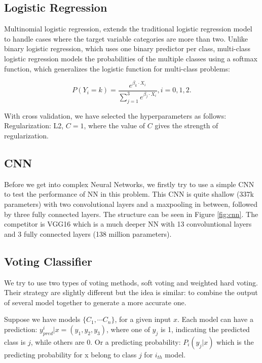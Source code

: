 \documentclass[
  11pt,
]{article}
\begin{document}
\hypertarget{logistic-regression}{%
\subsection{Logistic Regression}\label{logistic-regression}}

Multinomial logistic regression, extends the traditional logistic regression model to handle cases where the target variable categories are more than two. Unlike binary logistic regression, which uses one binary predictor per class, multi-class logistic regression models the probabilities of the multiple classes using a softmax function, which generalizes the logistic function for multi-class problems:

\[
P(Y_i = k) = \frac{e^{\beta_k \cdot X_i}}{\sum_{j = 1}^3 e^{\beta_j \cdot X_i}}, i = 0, 1, 2.
\]

With cross validation, we have selected the hyperparameters as follows: Regularization: L2, \(C = 1\), where the value of \(C\) gives the strength of regularization.

\hypertarget{cnn}{%
\subsection{CNN}\label{cnn}}

Before we get into complex Neural Networks, we firstly try to use a simple CNN to test the performance of NN in this problem. This CNN is quite shallow (337k parameters) with two convolutional layers and a maxpooling in between, followed by three fully connected layers. The structure can be seen in Figure \ref{fig:cnn}. The competitor is VGG16 which is a much deeper NN with 13 convoluntional layers and 3 fully connected layers (138 million parameters).

\hypertarget{voting-classifier}{%
\subsection{Voting Classifier}\label{voting-classifier}}

We try to use two types of voting methods, soft voting and weighted hard voting. Their strategy are slightly different but the idea is similar: to combine the output of several model together to generate a more accurate one.

Suppose we have models \(\{C_1,\cdots C_n\}\), for a given input \(x\). Each model can have a prediction: \(y^i_{pred}|x=(y_1,y_2,y_3)\), where one of \(y_j\) is 1, indicating the predicted class is \(j\), while others are 0. Or a predicting probability: \(P_i(y_j | x)\) which is the predicting probability for x belong to class \(j\) for \(i_{th}\) model.
\end{document}
